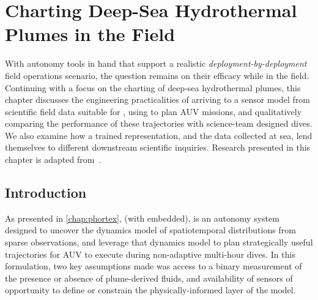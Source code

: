 \chapter{Charting Deep-Sea Hydrothermal Plumes in the Field}
\label{chap:field_results}

With autonomy tools in hand that support a realistic \emph{deployment-by-deployment} field operations scenario, the question remains on their efficacy while in the field. Continuing with a focus on the charting of deep-sea hydrothermal plumes, this chapter discusses the engineering practicalities of arriving to a sensor model from scientific field data suitable for \PHUMES, using \PHORTEX to plan AUV \Sentry missions, and qualitatively comparing the performance of these trajectories with science-team designed dives. We also examine how a trained \PHUMES representation, and the data collected at sea, lend themselves to different downstream scientific inquiries. Research presented in this chapter is adapted from~\cite{preston2022physically}.

\section{Introduction}
As presented in \cref{chap:phortex}, \PHORTEX (with \PHUMES embedded), is an autonomy system designed to uncover the dynamics model of spatiotemporal distributions from sparse observations, and leverage that dynamics model to plan strategically useful trajectories for AUV \Sentry to execute during non-adaptive multi-hour dives. In this formulation, two key assumptions made was access to a binary measurement of the presence or absence of plume-derived fluids, and availability of sensors of opportunity to define or constrain the physically-informed layer of the \PHUMES model. 

